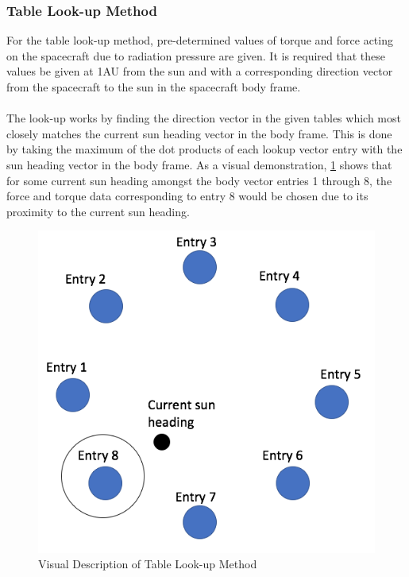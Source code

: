\subsubsection{Table Look-up Method}
For the table look-up method, pre-determined values of torque and force acting on the spacecraft due to radiation pressure are given. It is required that these values be given at 1AU from the sun and with a corresponding direction vector from the spacecraft to the sun in the spacecraft body frame.\\\\
The look-up works by finding the direction vector in the given tables which most closely matches the current sun heading vector in the body frame. This is done by taking the maximum of the dot products of each lookup vector entry with the sun heading vector in the body frame. As a visual demonstration, \ref{fig:lookupMethod} shows that for some current sun heading amongst the body vector entries 1 through 8, the force and torque data corresponding to entry 8 would be chosen due to its proximity to the current sun heading.
\begin{figure}[H]
	\centerline{
		\includegraphics[height=0.5\textwidth, keepaspectratio]{Figures/lookupDiagram}}
	\caption{Visual Description of Table Look-up Method}
	\label{fig:lookupMethod}
\end{figure}


